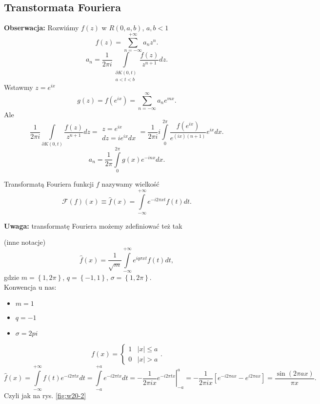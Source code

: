 \documentclass[../main.tex]{subfiles}
\begin{document}
\subsection{Transtormata Fouriera}
\textbf{Obserwacja:} Rozwińmy $f(z)$ w $R(0,a,b)$, $a,b < 1$
\[
    f(z) = \sum_{n=-\infty}^{+\infty} a_nz^n
.\]
\[
    a_n = \frac{1}{2\pi i}\int\limits_{\substack{\partial K(0,t)\\ a < t < b}}\frac{f(z)}{z^{n+1}}dz
.\]
Wstawmy $z = e^{ix}$
 \[
     g(z) = f\left(e^{ix}\right) = \sum_{n=-\infty}^{\infty} a_n e^{mx}
 .\]
 Ale
 \[
     \frac{1}{2\pi i} \int\limits_{\partial K(0,t)}\frac{f(z)}{z^{n+1}}dz = \begin{matrix} z = e^{ix}\\ dz = ie^{ix}dx\end{matrix} = \frac{1}{2\pi i}i \int\limits_{0}^{2\pi} \frac{f\left( e^{ix} \right) }{e^{(ix)(n+1)}}e^{ix}dx
 .\]
 \[
     a_n = \frac{1}{2\pi}\int\limits_{0}^{2\pi}g(x)e^{-inx}dx
 .\]
 \begin{definicja}
     Transformatą Fouriera funkcji $f$ nazywamy wielkość
     \[
         \mathcal{F}(f)(x) \equiv \hat{f}(x) = \int\limits_{-\infty}^{+\infty} e^{-i2\pi xt}f(t)dt
     .\]
 \end{definicja}
 \textbf{Uwaga: }transformatę Fouriera możemy zdefiniować też tak
 \begin{definicja}
     (inne notacje)
     \[
         \hat{f}(x) = \frac{1}{\sqrt{m} }\int\limits_{-\infty}^{+\infty}e^{iq\sigma xt}f(t)dt
     ,\]
 gdzie $m = \left\{ 1,2\pi \right\} $, $q = \left\{ -1, 1 \right\} $, $\sigma = \left\{ 1,2\pi \right\} $.\\
     Konwencja u nas:
     \begin{itemize}
         \item $m = 1 $
         \item $q = - 1$
         \item $\sigma = 2pi$
     \end{itemize}
 \end{definicja}
 \begin{przyklad}
     \[
         f(x) = \begin{cases}
             1&|x|\le a\\ 0 & |x| > a
         \end{cases}
     .\]
 \[
     \hat{f}(x) = \int\limits_{-\infty}^{+\infty}f(t)e^{-i 2\pi t x}dt = \int\limits_{-a}^{+a}e^{-i 2\pi tx}dt = \left.-\frac{1}{2\pi i x}e^{-i 2 \pi t x}\right|_{-a}^{a} = -\frac{1}{2\pi i x}\left[ e^{-i 2 \pi a x} - e^{i 2 \pi a x} \right] = \frac{\sin(2\pi a x)}{\pi x}
 .\]
 Czyli jak na rys. \ref{fig:w20-2}
 \end{przyklad}
\end{document}
